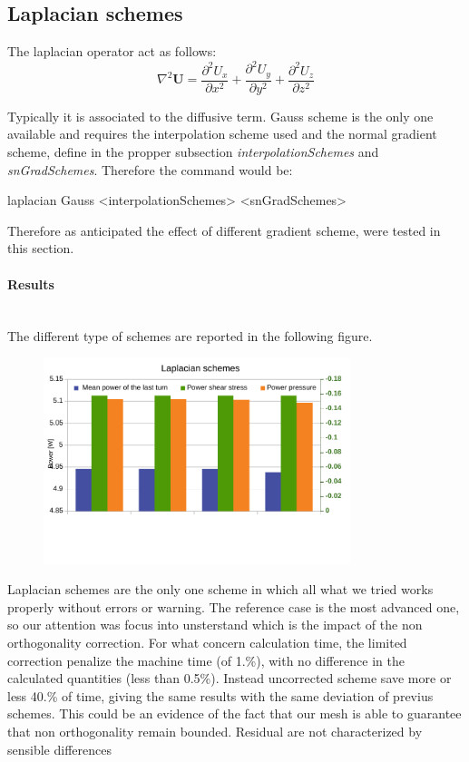 \documentclass[a4paper,12pt]{article}
\begin{document}
\subsection{Laplacian schemes}
The laplacian operator act as follows:
\begin{equation}
\nabla^2 \bm{U} = \frac{\partial^2 U_x}{\partial x^2}+ \frac{\partial^2 U_y}{\partial y^2} + \frac{\partial^2 U_z}{\partial z^2}
\end{equation}

Typically it is associated to the diffusive term. Gauss scheme is the only one available and requires the interpolation scheme used and the normal gradient scheme, define in the propper subsection \textit{interpolationSchemes} and \textit{snGradSchemes}. Therefore the command would be:

\begin{center}
{\ttfamily laplacian	Gauss	<interpolationSchemes>		<snGradSchemes>}
\end{center}

Therefore as anticipated the effect of different gradient scheme, were tested in this section.

\paragraph{Results} \mbox{}\\
The different type of schemes are reported in the following figure.
\begin{figure}[H]
\centering
\includegraphics[height=6cm]{images/schemes/laplacianschems-results.pdf}
\end{figure}

Laplacian schemes are the only one scheme in which all what we tried works properly without errors or warning. The reference case is the most advanced one, so our attention was focus into unsterstand which is the impact of the non orthogonality correction. For what concern calculation time, the limited correction penalize the machine time (of 1.\%), with no difference in the calculated quantities (less than 0.5\%). Instead uncorrected scheme save more or less 40.\% of time, giving the same results with the same deviation of previus schemes. This could be an evidence of the fact that our mesh is able to guarantee that non orthogonality remain bounded. Residual are not characterized by sensible differences
\end{document}
